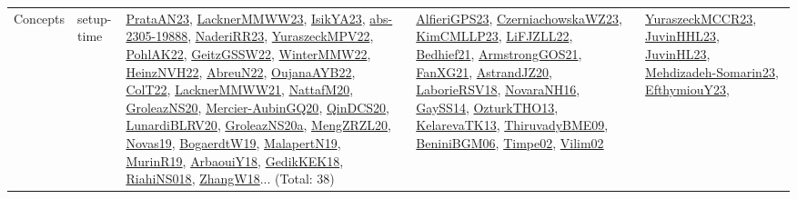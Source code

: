 {\begin{longtable}{lp{3cm}>{\raggedright}p{6cm}>{\raggedright}p{6cm}p{8cm}}
Concepts & setup-time & \href{articles/PrataAN23.pdf}{PrataAN23}\cite{PrataAN23}, \href{articles/LacknerMMWW23.pdf}{LacknerMMWW23}\cite{LacknerMMWW23}, \href{articles/IsikYA23.pdf}{IsikYA23}\cite{IsikYA23}, \href{articles/abs-2305-19888.pdf}{abs-2305-19888}\cite{abs-2305-19888}, \href{articles/NaderiRR23.pdf}{NaderiRR23}\cite{NaderiRR23}, \href{articles/YuraszeckMPV22.pdf}{YuraszeckMPV22}\cite{YuraszeckMPV22}, \href{articles/PohlAK22.pdf}{PohlAK22}\cite{PohlAK22}, \href{papers/GeitzGSSW22.pdf}{GeitzGSSW22}\cite{GeitzGSSW22}, \href{papers/WinterMMW22.pdf}{WinterMMW22}\cite{WinterMMW22}, \href{articles/HeinzNVH22.pdf}{HeinzNVH22}\cite{HeinzNVH22}, \href{articles/AbreuN22.pdf}{AbreuN22}\cite{AbreuN22}, \href{papers/OujanaAYB22.pdf}{OujanaAYB22}\cite{OujanaAYB22}, \href{articles/ColT22.pdf}{ColT22}\cite{ColT22}, \href{papers/LacknerMMWW21.pdf}{LacknerMMWW21}\cite{LacknerMMWW21}, \href{papers/NattafM20.pdf}{NattafM20}\cite{NattafM20}, \href{papers/GroleazNS20.pdf}{GroleazNS20}\cite{GroleazNS20}, \href{papers/Mercier-AubinGQ20.pdf}{Mercier-AubinGQ20}\cite{Mercier-AubinGQ20}, \href{articles/QinDCS20.pdf}{QinDCS20}\cite{QinDCS20}, \href{articles/LunardiBLRV20.pdf}{LunardiBLRV20}\cite{LunardiBLRV20}, \href{papers/GroleazNS20a.pdf}{GroleazNS20a}\cite{GroleazNS20a}, \href{articles/MengZRZL20.pdf}{MengZRZL20}\cite{MengZRZL20}, \href{articles/Novas19.pdf}{Novas19}\cite{Novas19}, \href{papers/BogaerdtW19.pdf}{BogaerdtW19}\cite{BogaerdtW19}, \href{papers/MalapertN19.pdf}{MalapertN19}\cite{MalapertN19}, \href{papers/MurinR19.pdf}{MurinR19}\cite{MurinR19}, \href{papers/ArbaouiY18.pdf}{ArbaouiY18}\cite{ArbaouiY18}, \href{articles/GedikKEK18.pdf}{GedikKEK18}\cite{GedikKEK18}, \href{papers/RiahiNS018.pdf}{RiahiNS018}\cite{RiahiNS018}, \href{articles/ZhangW18.pdf}{ZhangW18}\cite{ZhangW18}... (Total: 38) & \href{articles/AlfieriGPS23.pdf}{AlfieriGPS23}\cite{AlfieriGPS23}, \href{articles/CzerniachowskaWZ23.pdf}{CzerniachowskaWZ23}\cite{CzerniachowskaWZ23}, \href{papers/KimCMLLP23.pdf}{KimCMLLP23}\cite{KimCMLLP23}, \href{papers/LiFJZLL22.pdf}{LiFJZLL22}\cite{LiFJZLL22}, \href{articles/Bedhief21.pdf}{Bedhief21}\cite{Bedhief21}, \href{papers/ArmstrongGOS21.pdf}{ArmstrongGOS21}\cite{ArmstrongGOS21}, \href{articles/FanXG21.pdf}{FanXG21}\cite{FanXG21}, \href{articles/AstrandJZ20.pdf}{AstrandJZ20}\cite{AstrandJZ20}, \href{articles/LaborieRSV18.pdf}{LaborieRSV18}\cite{LaborieRSV18}, \href{articles/NovaraNH16.pdf}{NovaraNH16}\cite{NovaraNH16}, \href{papers/GaySS14.pdf}{GaySS14}\cite{GaySS14}, \href{articles/OzturkTHO13.pdf}{OzturkTHO13}\cite{OzturkTHO13}, \href{papers/KelarevaTK13.pdf}{KelarevaTK13}\cite{KelarevaTK13}, \href{papers/ThiruvadyBME09.pdf}{ThiruvadyBME09}\cite{ThiruvadyBME09}, \href{papers/BeniniBGM06.pdf}{BeniniBGM06}\cite{BeniniBGM06}, \href{articles/Timpe02.pdf}{Timpe02}\cite{Timpe02}, \href{papers/Vilim02.pdf}{Vilim02}\cite{Vilim02} & \href{articles/YuraszeckMCCR23.pdf}{YuraszeckMCCR23}\cite{YuraszeckMCCR23}, \href{papers/JuvinHHL23.pdf}{JuvinHHL23}\cite{JuvinHHL23}, \href{papers/JuvinHL23.pdf}{JuvinHL23}\cite{JuvinHL23}, \href{papers/Mehdizadeh-Somarin23.pdf}{Mehdizadeh-Somarin23}\cite{Mehdizadeh-Somarin23}, \href{papers/EfthymiouY23.pdf}{EfthymiouY23}\cite{EfthymiouY23}, 
\end{longtable}}

